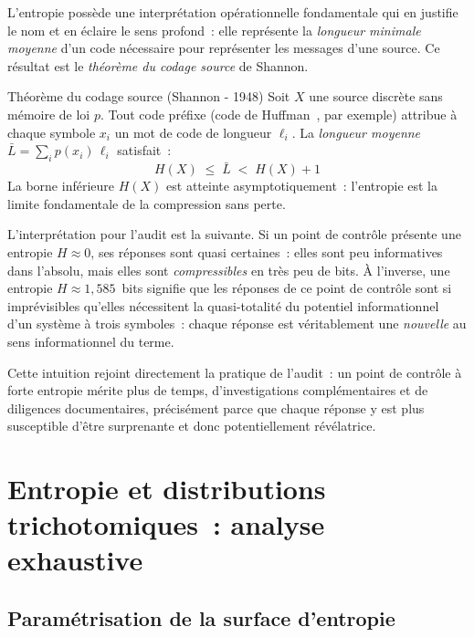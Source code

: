 L'entropie possède une interprétation opérationnelle fondamentale qui en justifie
le nom et en éclaire le sens profond~: elle représente la \emph{longueur minimale
moyenne} d'un code nécessaire pour représenter les messages d'une source. Ce
résultat est le \emph{théorème du codage source} de Shannon.

\begin{boiteTheoreme}{Théorème du codage source (Shannon - 1948)}
Soit $X$ une source discrète sans mémoire de loi $p$. Tout code préfixe
(code de Huffman~\cite{Huffman1952}, par exemple) attribue à chaque symbole $x_i$
un mot de code de longueur $\ell_i$. La \emph{longueur moyenne} $\bar{L} =
\sum_i p(x_i)\,\ell_i$ satisfait~:
\begin{equation}
  H(X) \;\leq\; \bar{L} \;<\; H(X) + 1
  \label{eq:codage-source}
\end{equation}
La borne inférieure $H(X)$ est atteinte asymptotiquement~: l'entropie est la
limite fondamentale de la compression sans perte.
\end{boiteTheoreme}

L'interprétation pour l'audit est la suivante. Si un point de contrôle présente
une entropie $H \approx 0$, ses réponses sont quasi certaines~: elles sont peu
informatives dans l'absolu, mais elles sont \emph{compressibles} en très peu de
bits. À l'inverse, une entropie $H \approx 1{,}585$~bits signifie que les
réponses de ce point de contrôle sont si imprévisibles qu'elles nécessitent la
quasi-totalité du potentiel informationnel d'un système à trois symboles~: chaque
réponse est véritablement une \emph{nouvelle} au sens informationnel du terme.

Cette intuition rejoint directement la pratique de l'audit~: un point de contrôle
à forte entropie mérite plus de temps, d'investigations complémentaires et de
diligences documentaires, précisément parce que chaque réponse y est plus
susceptible d'être surprenante et donc potentiellement révélatrice.

\section{Entropie et distributions trichotomiques~: analyse exhaustive}
\label{sec:trichotomique}

\subsection{Paramétrisation de la surface d'entropie}

